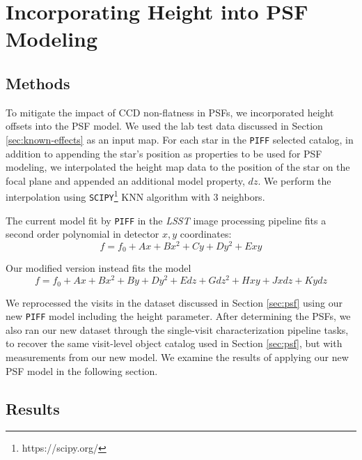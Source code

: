 \documentclass[SE,lsstdraft,authoryear,toc]{lsstdoc}
\begin{document}
\section{Incorporating Height into PSF Modeling}\label{sec:zmodel}

\subsection{Methods}

To mitigate the impact of CCD non-flatness in PSFs, we incorporated height offsets into the PSF model.
We used the lab test data discussed in Section \ref{sec:known-effects} as an input map.
For each star in the \texttt{PIFF} selected catalog, in addition to appending the star's position as properties to be used for PSF modeling, we interpolated the height map data to the position of the star on the focal plane and appended an additional model property, $dz$. 
We perform the interpolation using \texttt{SCIPY}\footnote{https://scipy.org/} KNN algorithm with 3 neighbors.


The current model fit by \texttt{PIFF} in the \textit{LSST} image processing pipeline fits a second order polynomial in detector $x,y$ coordinates:
\begin{equation}\label{eq:pipeline_piff_model}
    f = f_0 + A x + B x^2 + C y + D y^2 + E x y
\end{equation}

Our modified version instead fits the model
\begin{equation}\label{eq:dz_piff_model}
    f = f_0 + A x + B x^2 + B y + D y^2 + E dz + G dz^2 
    + H x y + J x dz + K y dz
\end{equation}

We reprocessed the visits in the dataset discussed in Section \ref{sec:psf} using our new \texttt{PIFF} model including the height parameter.
After determining the PSFs, we also ran our new dataset through the single-visit characterization pipeline tasks, to recover the same visit-level object catalog used in Section \ref{sec:psf}, but with measurements from our new model.
We examine the results of applying our new PSF model in the following section.

\subsection{Results}
\end{document}
